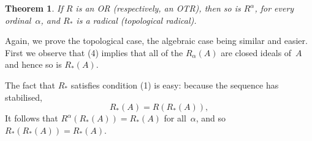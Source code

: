 \documentclass[11pt]{article}
\newcommand{\al}{\alpha}
\newtheorem{thm}{Theorem}[section]
\newenvironment{Proof}{{\it Proof. }}{}%
\newcommand{\Rsubstar}{R_*}
\begin{document}
\begin{thm}\label{T4}
If $R$ is an OR (respectively, an OTR), then so is $R^\al$,
for every ordinal~$\al$, and $\Rsubstar$ is a radical (topological radical).
\end{thm}

\begin{Proof}
Again, we prove the topological case, the algebraic case being similar and
easier.   First we observe that (4) implies that all of the $R_\al(A)$ are
closed ideals  of~$A$ and hence so is $\Rsubstar(A)$.

The fact that $\Rsubstar$ satisfies condition (1) is easy: because the sequence
has stabilised,
$$\Rsubstar(A) = R(\Rsubstar(A)),$$
It follows that $R^\al(\Rsubstar(A)) = \Rsubstar(A)$
for all~$\al$, and so $\Rsubstar(\Rsubstar(A)) = \Rsubstar(A)$.


\end{Proof}
\end{document}
